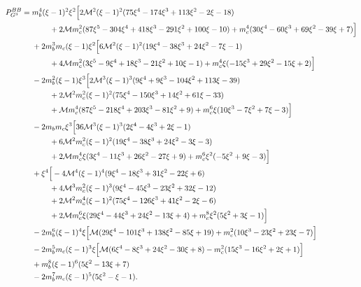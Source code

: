 \begin{align}
P^{BB}_{G^3}={}&
m_b^4(\xi-1)^2\xi^2\Big[
2\mathcal M^2(\xi-1)^2(75\xi^4-174\xi^3+113\xi^2-2\xi-18) \nonumber\\
&\hspace{0.8cm}
+2\mathcal M m_c^2(87\xi^5-304\xi^4+418\xi^3-291\xi^2+100\xi-10)
+m_c^4(30\xi^4-60\xi^3+69\xi^2-39\xi+7)\Big] \nonumber\\
&+2m_b^3m_c(\xi-1)\xi^2\Big[
6\mathcal M^2(\xi-1)^2(19\xi^4-38\xi^3+24\xi^2-7\xi-1) \nonumber\\
&\hspace{0.8cm}
+4\mathcal M m_c^2(3\xi^5-9\xi^4+18\xi^3-21\xi^2+10\xi-1)
+m_c^4\xi(-15\xi^3+29\xi^2-15\xi+2)\Big] \nonumber\\
&-2m_b^2(\xi-1)\xi^3\Big[
2\mathcal M^3(\xi-1)^3(9\xi^4+9\xi^3-104\xi^2+113\xi-39) \nonumber\\
&\hspace{0.8cm}
+2\mathcal M^2m_c^2(\xi-1)^2(75\xi^4-150\xi^3+14\xi^2+61\xi-33) \nonumber\\
&\hspace{0.8cm}
+\mathcal M m_c^4(87\xi^5-218\xi^4+203\xi^3-81\xi^2+9)
+m_c^6\xi(10\xi^3-7\xi^2+7\xi-3)\Big] \nonumber\\
&-2m_bm_c\xi^3\Big[
36\mathcal M^3(\xi-1)^3(2\xi^4-4\xi^3+2\xi-1) \nonumber\\
&\hspace{0.8cm}
+6\mathcal M^2m_c^2(\xi-1)^2(19\xi^4-38\xi^3+24\xi^2-3\xi-3) \nonumber\\
&\hspace{0.8cm}
+2\mathcal M m_c^4\xi(3\xi^4-11\xi^3+26\xi^2-27\xi+9)
+m_c^6\xi^2(-5\xi^2+9\xi-3)\Big] \nonumber\\
&+\xi^4\Big[
-4\mathcal M^4(\xi-1)^4(9\xi^4-18\xi^3+31\xi^2-22\xi+6) \nonumber\\
&\hspace{0.8cm}
+4\mathcal M^3m_c^2(\xi-1)^3(9\xi^4-45\xi^3-23\xi^2+32\xi-12) \nonumber\\
&\hspace{0.8cm}
+2\mathcal M^2m_c^4(\xi-1)^2(75\xi^4-126\xi^3+41\xi^2-2\xi-6) \nonumber\\
&\hspace{0.8cm}
+2\mathcal M m_c^6\xi(29\xi^4-44\xi^3+24\xi^2-13\xi+4)
+m_c^8\xi^2(5\xi^2+3\xi-1)\Big] \nonumber\\
&-2m_b^6(\xi-1)^4\xi
\Big[\mathcal M(29\xi^4-101\xi^3+138\xi^2-85\xi+19)
+m_c^2(10\xi^3-23\xi^2+23\xi-7)\Big] \nonumber\\
&-2m_b^5m_c(\xi-1)^3\xi
\Big[\mathcal M(6\xi^4-8\xi^3+24\xi^2-30\xi+8)
-m_c^2(15\xi^3-16\xi^2+2\xi+1)\Big] \nonumber\\
&+m_b^8(\xi-1)^6(5\xi^2-13\xi+7) \nonumber\\
&-2m_b^7m_c(\xi-1)^5(5\xi^2-\xi-1).
\end{align}

\endgroup
